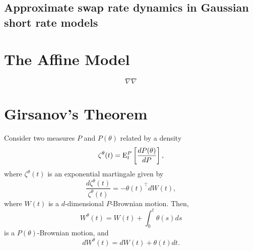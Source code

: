 \documentclass[12pt]{article}
\begin{document}
  \subsection{Approximate swap rate dynamics in Gaussian short rate models}



\section{The Affine Model}

  $$\nabla\nabla$$


\appendix

  \section{Girsanov's Theorem}

  Consider two measures $P$ and $P(\theta)$ related by a density
  \begin{equation}
    \zeta^{\theta}(t) = {\rm E}_t^P\left[\frac{dP(\theta)}{dP}\right],
  \end{equation}
  where $\zeta^{\theta}(t)$ is an exponential martingale given by
  \begin{equation}
    \frac{d\zeta^{\theta}(t)}{\zeta^{\theta}(t)}=-\theta(t)^{\top}dW(t),
  \end{equation}
  where $W(t)$ is a $d$-dimensional $P$-Brownian motion. Then,
  \begin{equation}
    W^{\theta}(t) = W(t)+\int_0^t\theta(s)ds
  \end{equation}
  is a $P(\theta)$-Brownian motion, and
  \begin{equation}
    dW^{\theta}(t) = dW(t)+ \theta(t)dt.
  \end{equation}






\end{document}
